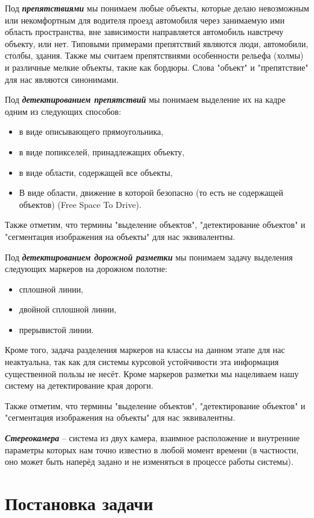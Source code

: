\documentclass[aps,%
14pt,%
final,%
oneside,
onecolumn,%
musixtex, %
superscriptaddress,%
centertags]{extarticle} %
\begin{document}
Под \textit{\textbf{препятствиями}} мы понимаем любые объекты, которые делаю невозможным или некомфортным для водителя проезд автомобиля через занимаемую ими область пространства, вне зависимости направляется автомобиль навстречу объекту, или нет. Типовыми примерами препятствий являются люди, автомобили, столбы, здания. Также мы считаем препятствиями особенности рельефа (холмы) и различные мелкие объекты, такие как бордюры. Слова "объект" и "препятствие" для нас являются синонимами. 

Под \textit{\textbf{детектированием препятствий}} мы понимаем выделение их на кадре одним из следующих способов:
\begin{itemize}
    \item в виде описывающего прямоугольника,
    \item в виде попикселей, принадлежащих объекту,
    \item в виде области, содержащей все объекты,
    \item В виде области, движение в которой безопасно (то есть не содержащей объектов) (Free Space To Drive).
\end{itemize}
Также отметим, что термины "выделение объектов", "детектирование объектов" и "сегментация изображения на объекты" для нас эквивалентны.

Под \textit{\textbf{детектированием дорожной разметки}} мы понимаем задачу выделения следующих маркеров на дорожном полотне:
\begin{itemize}
    \item сплошной линии,
    \item двойной сплошной линии,
    \item прерывистой линии.
\end{itemize}

Кроме того, задача разделения маркеров на классы на данном этапе для нас неактуальна, так как для системы курсовой устойчивости эта информация существенной пользы не несёт.
Кроме маркеров разметки мы нацеливаем нашу систему на детектирование края дороги.

Также отметим, что термины "выделение объектов", "детектирование объектов" и "сегментация изображения на объекты" для нас эквивалентны.

\textit{\textbf{Стереокамера}} -- система из двух камера, взаимное расположение и внутренние параметры которых нам точно известно в любой момент времени (в частности, оно может быть наперёд задано и не изменяться в процессе работы системы).


\section{Постановка задачи}
\end{document}

